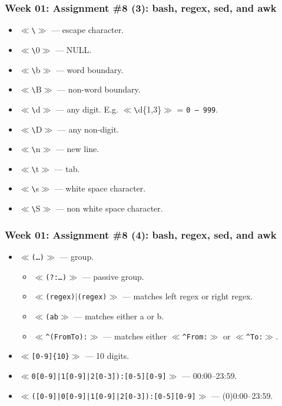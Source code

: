 \documentclass[xcolor=table, notheorems, hyperref={pdfpagelabels=false}]{beamer}
\begin{document}
\begin{frame}[fragile]
\frametitle{Week 01: Assignment \#8 (3): bash, regex, sed, and awk}
\begin{itemize}
\item $\ll$\texttt{\textbackslash}$\gg$ --- escape character.
\item $\ll$\texttt{\textbackslash}0$\gg$ --- NULL.
\item $\ll$\texttt{\textbackslash}b$\gg$ --- word boundary.
\item $\ll$\texttt{\textbackslash}B$\gg$ --- non-word boundary.
\item $\ll$\texttt{\textbackslash}d$\gg$ --- any digit. E.g. $\ll$\texttt{\textbackslash}d\{1,3\}$\gg$
      = \texttt{0 -- 999}.
\item $\ll$\texttt{\textbackslash}D$\gg$ --- any non-digit.
\item $\ll$\texttt{\textbackslash}n$\gg$ --- new line.
\item $\ll$\texttt{\textbackslash}t$\gg$ --- tab.
\item $\ll$\texttt{\textbackslash}s$\gg$ --- white space character.
\item $\ll$\texttt{\textbackslash}S$\gg$ --- non white space character.
\end{itemize}
\end{frame}

\begin{frame}[fragile]
\frametitle{Week 01: Assignment \#8 (4): bash, regex, sed, and awk}
\begin{itemize}
\item $\ll$\texttt{(\ldots)}$\gg$ --- group.
\begin{itemize}
\item $\ll$\texttt{(?:\ldots)}$\gg$ --- passive group.
\item $\ll$\texttt{(regex)$\mid$(regex)}$\gg$ --- matches left regex or right regex.
\item $\ll$\texttt{(a\textbar{}b}$\gg$ --- matches either a or b.
\item $\ll$\texttt{\^{}(From\textbar{}To):}$\gg$ --- matches either $\ll$\texttt{\^{}From:}$\gg$ or
      $\ll$\texttt{\^{}To:}$\gg$.
\end{itemize}
\item $\ll$\texttt{[0-9]\{10\}}$\gg$ --- 10 digits.
\item $\ll$\texttt{0[0-9]|1[0-9]|2[0-3]):[0-5][0-9]}$\gg$ --- 00:00--23:59.
\item $\ll$\texttt{([0-9]|0[0-9]|1[0-9]|2[0-3]):[0-5][0-9]}$\gg$ --- (0)0:00--23:59.
\end{itemize}
\end{frame}
\end{document}
